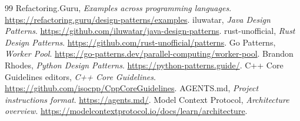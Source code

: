 \documentclass[11pt,letterpaper]{article}
\begin{document}
\begin{thebibliography}{99}
 Refactoring.Guru, \emph{Examples across programming languages}. \url{https://refactoring.guru/design-patterns/examples}.
 iluwatar, \emph{Java Design Patterns}. \url{https://github.com/iluwatar/java-design-patterns}.
 rust-unofficial, \emph{Rust Design Patterns}. \url{https://github.com/rust-unofficial/patterns}.
 Go Patterns, \emph{Worker Pool}. \url{https://go-patterns.dev/parallel-computing/worker-pool}.
 Brandon Rhodes, \emph{Python Design Patterns}. \url{https://python-patterns.guide/}.
 C++ Core Guidelines editors, \emph{C++ Core Guidelines}. \url{https://github.com/isocpp/CppCoreGuidelines}.
 AGENTS.md, \emph{Project instructions format}. \url{https://agents.md/}.
 Model Context Protocol, \emph{Architecture overview}. \url{https://modelcontextprotocol.io/docs/learn/architecture}.
\end{thebibliography}
\end{document}
